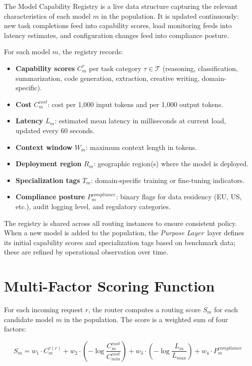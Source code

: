 \documentclass[12pt]{article}
\newcommand{\purpose}{\textit{Purpose Layer}}
\begin{document}
The Model Capability Registry is a live data structure capturing the relevant characteristics of each model $m$ in the population. It is updated continuously: new task completions feed into capability scores, load monitoring feeds into latency estimates, and configuration changes feed into compliance posture.

For each model $m$, the registry records:

\begin{itemize}[noitemsep]
    \item \textbf{Capability scores} $C_m^{\tau}$ per task category $\tau \in \mathcal{T}$ (reasoning, classification, summarization, code generation, extraction, creative writing, domain-specific).
    \item \textbf{Cost} $C_m^{cost}$: cost per 1,000 input tokens and per 1,000 output tokens.
    \item \textbf{Latency} $L_m$: estimated mean latency in milliseconds at current load, updated every 60 seconds.
    \item \textbf{Context window} $W_m$: maximum context length in tokens.
    \item \textbf{Deployment region} $R_m$: geographic region(s) where the model is deployed.
    \item \textbf{Specialization tags} $T_m$: domain-specific training or fine-tuning indicators.
    \item \textbf{Compliance posture} $P_m^{compliance}$: binary flags for data residency (EU, US, etc.), audit logging level, and regulatory categories.
\end{itemize}

The registry is shared across all routing instances to ensure consistent policy. When a new model is added to the population, the \purpose\ layer defines its initial capability scores and specialization tags based on benchmark data; these are refined by operational observation over time.

\section{Multi-Factor Scoring Function}
\label{sec:scoring}

For each incoming request $r$, the router computes a routing score $S_m$ for each candidate model $m$ in the population. The score is a weighted sum of four factors:

\begin{equation}
S_m = w_1 \cdot C_m^{\tau(r)} + w_2 \cdot \left(-\log\frac{C_m^{cost}}{C_{min}^{cost}}\right) + w_3 \cdot \left(-\log\frac{L_m}{L_{max}}\right) + w_4 \cdot P_m^{compliance}
\label{eq:scoring}
\end{equation}
\end{document}

